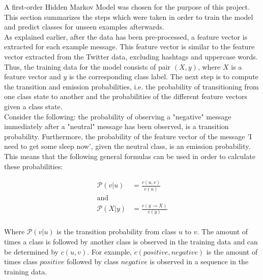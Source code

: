 A first-order Hidden Markov Model was chosen for the purpose of this project. This section summarizes the steps which were taken in order to train the model and predict classes for unseen examples afterwards. \\

\noindent As explained earlier, after the data has been pre-processed, a feature vector is extracted for each example message. This feature vector is similar to the feature vector extracted from the Twitter data, excluding hashtags and uppercase words. Thus, the training data for the model consists of pair $(X, y)$, where $X$ is a feature vector and $y$ is the corresponding class label. The next step is to compute the transition and emission probabilities, i.e. the probability of transitioning from one class state to another and the probabilities of the different feature vectors given a class state. \\

\noindent  Consider the following: the probability of observing a "negative" message immediately after a "neutral" message has been observed, is a transition probability. Furthermore, the probability of the feature vector of the message 'I need to get some sleep now', given the neutral class, is an emission probability. This means that the following general formulas can be used in order to calculate these probabilities:


\begin{align*}
\mathcal{P}(v | u) & = \frac{c(u, v)}{c(u)}\\
\text{and}\\
\mathcal{P}(X | y) & = \frac{c(y \rightarrow X)}{c(y)}\\
\end{align*}

Where $\mathcal{P}(v | u)$ is the transition probability from class $u$ to $v$. The amount of times a class is followed by another class is observed in the training data and can be determined by $c(u, v)$. For example, $c(positive, negative)$ is the amount of times class $positive$ followed by class $negative$ is observed in a sequence in the training data.

